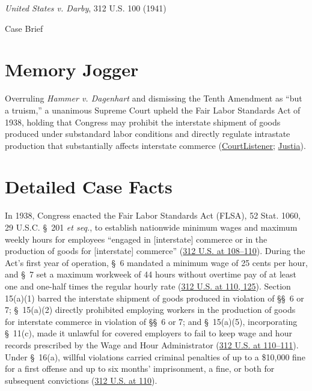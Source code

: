 \documentclass[12pt]{article}
\begin{document}
\begin{center}
{\LARGE \textit{United States v. Darby}, 312 U.S. 100 (1941)\par}
\vspace{0.8em}
{\large Case Brief\par}
\end{center}
\vspace{1em}

\section{Memory Jogger}

Overruling \textit{Hammer v. Dagenhart} and dismissing the Tenth Amendment as ``but a truism,'' a unanimous Supreme Court upheld the Fair Labor Standards Act of 1938, holding that Congress may prohibit the interstate shipment of goods produced under substandard labor conditions and directly regulate intrastate production that substantially affects interstate commerce (\href{https://www.courtlistener.com/opinion/103442/united-states-v-darby/}{CourtListener}; \href{https://supreme.justia.com/cases/federal/us/312/100/}{Justia}).

\section{Detailed Case Facts}

In 1938, Congress enacted the Fair Labor Standards Act (FLSA), 52 Stat. 1060, 29 U.S.C. \S~201 \textit{et seq.}, to establish nationwide minimum wages and maximum weekly hours for employees ``engaged in [interstate] commerce or in the production of goods for [interstate] commerce'' (\href{https://supreme.justia.com/cases/federal/us/312/100/}{312 U.S. at 108--110}). During the Act's first year of operation, \S~6 mandated a minimum wage of 25 cents per hour, and \S~7 set a maximum workweek of 44 hours without overtime pay of at least one and one-half times the regular hourly rate (\href{https://supreme.justia.com/cases/federal/us/312/100/}{312 U.S. at 110, 125}). Section 15(a)(1) barred the interstate shipment of goods produced in violation of \S\S~6 or 7; \S~15(a)(2) directly prohibited employing workers in the production of goods for interstate commerce in violation of \S\S~6 or 7; and \S~15(a)(5), incorporating \S~11(c), made it unlawful for covered employers to fail to keep wage and hour records prescribed by the Wage and Hour Administrator (\href{https://supreme.justia.com/cases/federal/us/312/100/}{312 U.S. at 110--111}). Under \S~16(a), willful violations carried criminal penalties of up to a \$10,000 fine for a first offense and up to six months' imprisonment, a fine, or both for subsequent convictions (\href{https://supreme.justia.com/cases/federal/us/312/100/}{312 U.S. at 110}).
\end{document}
